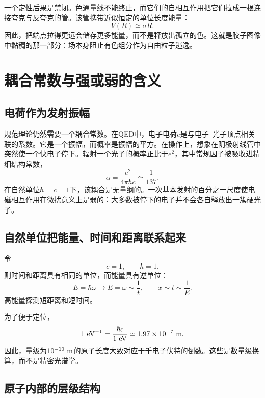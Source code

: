 一个定性后果是禁闭。色通量线不能终止，而它们的自相互作用把它们拉成一根连接夸克与反夸克的管。该管携带近似恒定的单位长度能量：
\begin{equation}
V(R)\simeq \sigma R.
\end{equation}
因此，把端点拉得更远会储存更多能量，而不是释放出孤立的色。这就是胶子图像中黏稠的那一部分：场本身阻止有色组分作为自由粒子逃逸。

\section{耦合常数与强或弱的含义}

\subsection{电荷作为发射振幅}

规范理论仍然需要一个耦合常数。在QED中，电子电荷\(e\)是与电子--光子顶点相关联的系数。它是一个振幅，而概率是振幅的平方。在操作上，想象在阴极射线管中突然使一个快电子停下。辐射一个光子的概率正比于\(e^2\)，其中常规因子被吸收进精细结构常数，
\begin{equation}
\alpha=\frac{e^2}{4\pi\hbar c}
\simeq \frac{1}{137}.
\label{eq:l5-alpha}
\end{equation}
在自然单位\(\hbar=c=1\)下，该耦合是无量纲的。一次基本发射的百分之一尺度使电磁相互作用在微扰意义上是弱的：大多数被停下的电子并不会各自释放出一簇硬光子。

\subsection{自然单位把能量、时间和距离联系起来}

令
\begin{equation}
c=1,
\qquad
\hbar=1.
\end{equation}
则时间和距离具有相同的单位，而能量具有逆单位：
\begin{equation}
E=\hbar\omega\longrightarrow E=\omega\sim\frac1t,
\qquad
x\sim t\sim\frac1E.
\end{equation}
高能量探测短距离和短时间。

为了便于定位，
\begin{equation}
1\ {\rm eV}^{-1}
=\frac{\hbar c}{1\ {\rm eV}}
\simeq 1.97\times10^{-7}\ {\rm m}.
\end{equation}
因此，量级为\(10^{-10}\ {\rm m}\)的原子长度大致对应于千电子伏特的倒数。这些是数量级换算，而不是精密光谱学。

\subsection{原子内部的层级结构}

